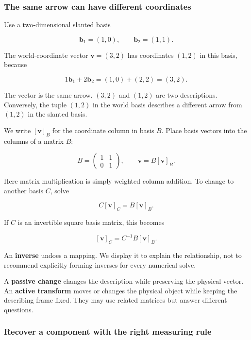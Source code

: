 \subsubsection{The same arrow can have different coordinates}\label{01-foundations-i-ch017-the-same-arrow-can-have-different-coordinates}

Use a two-dimensional slanted basis

\[
\mathbf b_1=(1,0),\qquad \mathbf b_2=(1,1).
\]

The world-coordinate vector \(\mathbf v=(3,2)\) has coordinates \((1,2)\) in this basis, because

\[
1\mathbf b_1+2\mathbf b_2=(1,0)+(2,2)=(3,2).
\]

The vector is the same arrow. \((3,2)\) and \((1,2)\) are two descriptions. Conversely, the tuple \((1,2)\) in the world basis describes a different arrow from \((1,2)\) in the slanted basis.

We write \([\mathbf v]_B\) for the coordinate column in basis \(B\). Place basis vectors into the columns of a matrix \(B\):

\[
B=\begin{pmatrix}1&1\\0&1\end{pmatrix},\qquad
\mathbf v=B[\mathbf v]_B.
\]

Here matrix multiplication is simply weighted column addition. To change to another basis \(C\), solve

\[
C[\mathbf v]_C=B[\mathbf v]_B.
\]

If \(C\) is an invertible square basis matrix, this becomes

\[
[\mathbf v]_C=C^{-1}B[\mathbf v]_B.
\]

An \textbf{inverse} undoes a mapping. We display it to explain the relationship, not to recommend explicitly forming inverses for every numerical solve.

A \textbf{passive change} changes the description while preserving the physical vector. An \textbf{active transform} moves or changes the physical object while keeping the describing frame fixed. They may use related matrices but answer different questions.

\subsubsection{Recover a component with the right measuring rule}\label{01-foundations-i-ch017-recover-a-component-with-the-right-measuring-rule}

